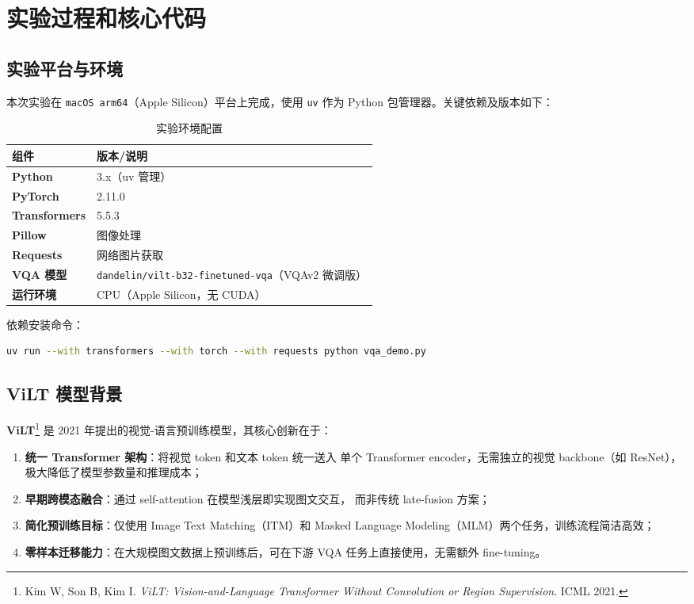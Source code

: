 \documentclass[UTF8,a4paper,12pt,fontset=none]{ctexart}
\begin{document}
\section{实验过程和核心代码}

\subsection{实验平台与环境}

本次实验在 \texttt{macOS arm64}（Apple Silicon）平台上完成，使用 \texttt{uv}
作为 Python 包管理器。关键依赖及版本如下：

\begin{table}[H]
  \centering
  \caption{实验环境配置}
  \small
  \renewcommand{\arraystretch}{1.2}
  \begin{tabularx}{\textwidth}{>{\bfseries}p{5cm}X}
    \toprule
    组件 & 版本/说明 \\
    \midrule
    Python & 3.x（uv 管理） \\
    PyTorch & 2.11.0 \\
    Transformers & 5.5.3 \\
    Pillow & 图像处理 \\
    Requests & 网络图片获取 \\
    VQA 模型 & \texttt{dandelin/vilt-b32-finetuned-vqa}（VQAv2 微调版） \\
    运行环境 & CPU（Apple Silicon，无 CUDA） \\
    \bottomrule
  \end{tabularx}
\end{table}

依赖安装命令：
\begin{lstlisting}[language=bash]
uv run --with transformers --with torch --with requests python vqa_demo.py
\end{lstlisting}

\subsection{ViLT 模型背景}

\textbf{ViLT}\footnote{Kim W, Son B, Kim I. \textit{ViLT: Vision-and-Language
Transformer Without Convolution or Region Supervision}. ICML 2021.}
是 2021 年提出的视觉-语言预训练模型，其核心创新在于：

\begin{enumerate}[leftmargin=2.2em]
  \item \textbf{统一 Transformer 架构}：将视觉 token 和文本 token 统一送入
    单个 Transformer encoder，无需独立的视觉 backbone（如 ResNet），
    极大降低了模型参数量和推理成本；
  \item \textbf{早期跨模态融合}：通过 self-attention 在模型浅层即实现图文交互，
    而非传统 late-fusion 方案；
  \item \textbf{简化预训练目标}：仅使用 Image Text Matching（ITM）和
    Masked Language Modeling（MLM）两个任务，训练流程简洁高效；
  \item \textbf{零样本迁移能力}：在大规模图文数据上预训练后，可在下游 VQA
    任务上直接使用，无需额外 fine-tuning。
\end{enumerate}
\end{document}
